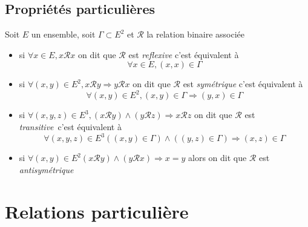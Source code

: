 \documentclass[11pt,colorlinks]{book}
\theoremstyle{mytheoremstyle}
\theoremstyle{mytheoremstyle}
\theoremstyle{mytheoremstyle}
\theoremstyle{mytheoremstyle}
\theoremstyle{mytheoremstyle}
\theoremstyle{mytheoremstyle}
\theoremstyle{mytheoremstyle}
\theoremstyle{mytheoremstyle}
\theoremstyle{myproblemstyle}
\def\mfc#1{\mathcal{#1}}
\def\mR{\mfc{R}}
\begin{document}
\subsection{Propriétés particulières}
\begin{definition}
  Soit $E$ un ensemble, soit $\Gamma \subset E^2$ et $\mathcal{R}$ la relation binaire associée
  \begin{itemize}
    \item si $\forall x \in E, x\mathcal{R}x$ on dit que $\mathcal{R}$ est \textit{reflexive} c'est équivalent à 
    \begin{equation*}
      \forall x \in E, (x,x) \in \Gamma
    \end{equation*}
    \item si $\forall (x,y) \in E^2, x\mR y \Rightarrow y\mR x$ on dit que $\mR$ est \textit{symétrique} c'est équivalent à 
    \begin{equation*}
      \forall (x,y) \in E^2, (x,y) \in \Gamma \Rightarrow (y,x) \in \Gamma
    \end{equation*}
    \item si $\forall (x,y,z) \in E^3, (x \mR y) \wedge (y \mR z) \Rightarrow x\mR z$ on dit que $\mR$ est \textit{transitive} c'est équivalent à 
    \begin{equation*}
      \forall (x,y,z) \in E^3 ((x,y) \in \Gamma) \wedge ((y,z) \in \Gamma) \Rightarrow (x,z) \in \Gamma
    \end{equation*}
    \item si $\forall (x,y) \in E^2 (x\mR y) \wedge (y\mR x) \Rightarrow x=y$ alors on dit que $\mR$ est \textit{antisymétrique}
  \end{itemize}
\end{definition}
\section{Relations particulière}
\end{document}
